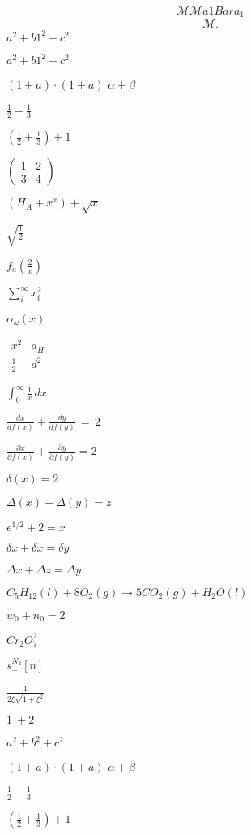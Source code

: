 \documentclass{article}
\begin{document}
\[
  \mathcal{M}
  \mathcal{M} a1Bar
  a_{1}
\]
\begin{equation}
  \begin{aligned}
    \mathcal{M}
    .
  \end{aligned}
\end{equation}
$a^2 + b1^2 + c^2$

$a^2 + b1^2 + c^2$

$(1 + a) \cdot (1 + a)$
$\alpha + \beta$

$\frac{1}{2} + \frac{1}{3}$

$(\frac{1}{2} + \frac{1}{3}) + 1$

$
\begin{pmatrix} 1 & 2 \\ 3 & 4
\end{pmatrix}$

$(H_A+x^x)+\sqrt{x}$

$\sqrt{\frac{1}{2}}$

$f_a(\frac{2}{x})$

$\sum_i^{\infty} x_i^2$

$\alpha_{\omega}(x)$

$
\begin{matrix} x^2 & a_H \\ \frac{1}{2} & d^2
\end{matrix}$

$\int_0^{\infty} \frac{1}{x}\, dx$

$\frac{dx}{df(x)} + \frac{dy}{df(y)}\, =\, 2$

$\frac{\partial x}{\partial f(x)} + \frac{\partial y}{\partial f(y)} = 2$

$\delta (x) = 2$

$\Delta (x) + \Delta (y) = z$

$e^{1/2} + 2 = x$

$\delta x + \delta x = \delta y$

$\Delta x + \Delta z = \Delta y$

$C_5H_{12}(l)+8O_2(g)\rightarrow 5CO_2(g)+H_2O(l)$

$w_0 + n_0 = 2$

$Cr_2O_7^2$

$s^{N_2}_+ [n]$

$\frac{1}{2\xi \sqrt{1+\xi^2}}$

$1\: + 2$

$a^2 + b^2 + c^2$

$(1 + a) \cdot (1 + a)$
$\alpha + \beta$

$\frac{1}{2} + \frac{1}{3}$

$(\frac{1}{2} + \frac{1}{3}) + 1$
\end{document}
